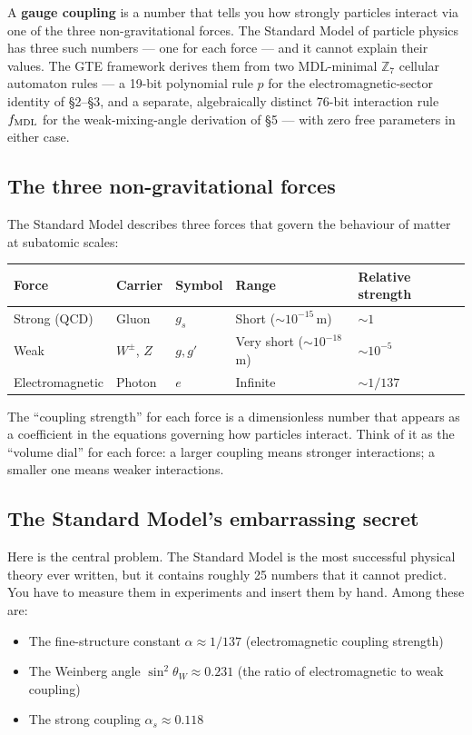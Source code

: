 \documentclass[11pt,a4paper]{article}
\newcommand{\term}[1]{\textbf{#1}}
\newcommand{\sinwsq}{\sin^2\!\theta_W}
\begin{document}
\begin{tcolorbox}[colback=boxblue,colframe=blue!40!black,title=The one-line answer]
A \term{gauge coupling} is a number that tells you how strongly particles
interact via one of the three non-gravitational forces.  The Standard Model
of particle physics has three such numbers — one for each force — and it
cannot explain their values.  The GTE framework derives them from two
MDL-minimal $\mathbb{Z}_7$ cellular automaton rules --- a 19-bit polynomial
rule $p$ for the electromagnetic-sector identity of \S2--\S3, and a
separate, algebraically distinct 76-bit interaction rule $f_{\rm MDL}$ for the
weak-mixing-angle derivation of \S5 --- with zero free parameters in either
case.
\end{tcolorbox}

\subsection{The three non-gravitational forces}

The Standard Model describes three forces that govern the behaviour of matter
at subatomic scales:

\begin{center}
\begin{tabular}{lllll}
\toprule
Force & Carrier & Symbol & Range & Relative strength \\
\midrule
Strong (QCD)  & Gluon          & $g_s$  & Short ($\sim 10^{-15}$\,m) & $\sim 1$ \\
Weak          & $W^{\pm}$, $Z$ & $g, g'$ & Very short ($\sim 10^{-18}$\,m) & $\sim 10^{-5}$ \\
Electromagnetic & Photon       & $e$    & Infinite & $\sim 1/137$ \\
\bottomrule
\end{tabular}
\end{center}

\bigskip
\noindent
The ``coupling strength'' for each force is a dimensionless number that
appears as a coefficient in the equations governing how particles interact.
Think of it as the ``volume dial'' for each force: a larger coupling means
stronger interactions; a smaller one means weaker interactions.

\subsection{The Standard Model's embarrassing secret}

Here is the central problem.  The Standard Model is the most successful
physical theory ever written, but it contains roughly 25 numbers that it
cannot predict.  You have to measure them in experiments and insert them by
hand.  Among these are:
\begin{itemize}
  \item The fine-structure constant $\alpha \approx 1/137$ (electromagnetic coupling strength)
  \item The Weinberg angle $\sinwsq \approx 0.231$ (the ratio of electromagnetic to weak coupling)
  \item The strong coupling $\alpha_s \approx 0.118$
\end{itemize}
\end{document}
